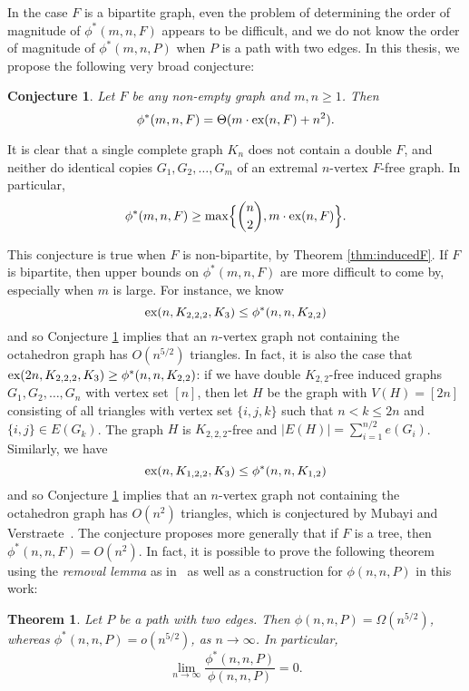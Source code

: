 \documentclass[12pt]{article}
\newcounter{foo}
\newtheorem{theorem}{Theorem}
\newtheorem{conjecture}{Conjecture}[foo]
\newcommand*{\ex}{\textnormal{ex}}
\begin{document}
In the case $F$ is a bipartite graph, even the problem of determining the order of magnitude of $\phi^*(m,n,F)$ appears to be difficult, and we do not know the order of magnitude of $\phi^*(m,n,P)$ when $P$ is a path with two edges. In this thesis, we propose the following very broad conjecture:

\begin{conjecture}\label{conj:main}
Let $F$ be any non-empty graph and $m,n \geq 1$. Then 
\[ 
  \phi^*(m,n,F) = \Theta(m \cdot \ex(n,F) + n^2).
\]
\end{conjecture}

It is clear that a single complete graph $K_n$ does not contain a double $F$, and neither do identical copies $G_1,G_2,\dots,G_m$ of an extremal $n$-vertex $F$-free graph. In particular, 
\[ 
  \phi^*(m,n,F) \geq \max\Bigl\{\binom{n}{2},m\cdot \ex(n,F)\Bigr\}.
\]

This conjecture is true when $F$ is non-bipartite, by Theorem \ref{thm:inducedF}.  If $F$ is bipartite, then upper bounds on $\phi^*(m,n,F)$ are more difficult to come by, especially when $m$ is large. For instance, we know 
\[ 
  \ex(n,K_{2,2,2},K_3) \leq \phi^*(n,n,K_{2,2})
\]
and so Conjecture \ref{conj:main} implies that an $n$-vertex graph not containing the octahedron graph has $O(n^{5/2})$ triangles. In fact, it is also the case that $\ex(2n,K_{2,2,2},K_3) \geq \phi^*(n,n,K_{2,2})$: if we have double $K_{2,2}$-free induced graphs 
$G_1,G_2,\dots,G_{n}$ with vertex set $[n]$, then let $H$ be the graph with $V(H) = [2n]$ consisting of all triangles with vertex set $\{i,j,k\}$ such that $n < k \leq 2n$ and $\{i,j\} \in E(G_k)$. The graph $H$ is $K_{2,2,2}$-free and $|E(H)| = \sum_{i = 1}^{n/2} e(G_i)$. Similarly, we have
\[ 
  \ex(n,K_{1,2,2},K_3) \leq \phi^*(n,n,K_{1,2})
\]
and so Conjecture \ref{conj:main} implies that an $n$-vertex graph not containing the octahedron graph has $O(n^{2})$ triangles, which is conjectured by Mubayi and Verstraete~\cite{MubayiV2016}. The conjecture proposes more generally that if $F$ is a tree, then $\phi^*(n,n,F) = O(n^2)$. In fact, it is possible to prove the following theorem using the \textit{removal lemma} as in~\cite{MubayiMukherjee2023} as well as a construction for $\phi(n,n,P)$ in this work:

\begin{theorem}\label{thm:inducedP}
Let $P$ be a path with two edges. Then $\phi(n,n,P) = \Omega(n^{5/2})$, whereas $\phi^*(n,n,P) = o(n^{5/2})$, as $n \rightarrow \infty$. In particular, 
\[ 
  \lim_{n \rightarrow \infty} \frac{\phi^*(n,n,P)}{\phi(n,n,P)} = 0.
\]
\end{theorem}
\end{document}
